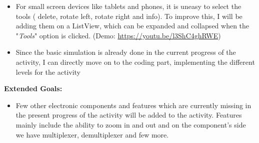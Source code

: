 \documentclass[preprint,12pt]{elsarticle}
\begin{document}
\begin{itemize}
\item For small screen devices like tablets and phones, it is uneasy to select the tools ( delete, rotate left, rotate right and info). To improve this, I will be adding them on a ListView, which can be expanded and collapsed when the "\textit{Tools}" option is clicked. (Demo: \href{https://youtu.be/l3ShC4ghRWE}{https://youtu.be/l3ShC4ghRWE})
\item Since the basic simulation is already done in the current progress of the activity, I can directly move on to the coding part, implementing the different levels for the activity
\end{itemize}

\textbf{Extended Goals:}
\begin{itemize}
\item Few other electronic components and features which are currently missing in the present progress of the activity will be added to the activity. Features mainly include the ability to zoom in and out and on the component’s side we have multiplexer, demultiplexer and few more.
\end{itemize}







\end{document}
